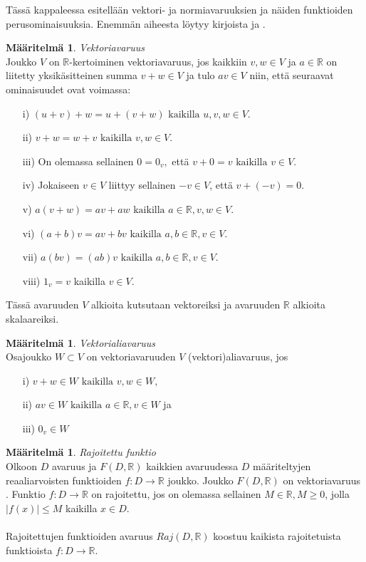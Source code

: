 \documentclass[12pt,a4paper,leqno]{report}
\newcommand{\R}{\mathbb{R}}
\newcommand{\N}{\mathbb{N}}
\theoremstyle{plain}
\theoremstyle{definition}
\newtheorem{maar}[equation]{Määritelmä}
\newtheorem{esim}[equation]{Esimerkki}
\theoremstyle{remark}
\begin{document}
Tässä kappaleessa esitellään vektori- ja normiavaruuksien ja näiden funktioiden perusominaisuuksia. Enemmän aiheesta löytyy kirjoista \cite{Topo1} ja \cite{Topo2}.
\begin{maar}
\emph{Vektoriavaruus}\\
Joukko $V$ on $\R$-kertoiminen vektoriavaruus, jos kaikkiin $v,w\in V$ ja $a\in \R$ on liitetty yksikäsitteinen summa $v+w\in V$ ja tulo $av\in V$ niin, että seuraavat ominaisuudet ovat voimassa:
\begin{itemize}
\item[i)\phantom{iiv}] $(u+v)+w=u+(v+w)\text{ kaikilla }u,v,w\in V.$
\item[ii)\phantom{iv}] $v+w=w+v\text{ kaikilla }v,w\in V.$
\item[iii)\phantom{v}] On olemassa sellainen $0=0_{v},$ että $v+0=v\text{ kaikilla }v\in V.$
\item[iv)\phantom{ii}] Jokaiseen $v\in V $ liittyy sellainen $-v\in V$, että $v+(-v)=0$.
\item[v)\phantom{iii}] $a(v+w)=av+aw\text{ kaikilla }a\in\R, v,w\in V.$
\item[vi)\phantom{ii}] $(a+b)v=av+bv\text{ kaikilla }a,b\in\R, v\in V.$
\item[vii)\phantom{i}] $a(bv)=(ab)v\text{ kaikilla }a,b\in\R, v\in V.$
\item[viii)] $1_{v}=v$ kaikilla $v\in V.$
\end{itemize}
Tässä avaruuden $V$ alkioita kutsutaan vektoreiksi ja avaruuden $\R$ alkioita skalaareiksi.

\end{maar}
\begin{maar}
\emph{Vektorialiavaruus}\\
Osajoukko $W\subset V$ on vektoriavaruuden $V$ (vektori)aliavaruus, jos
\begin{itemize}
\item[i)\phantom{iiv}] $v+w\in W\text{ kaikilla }v,w\in W,$
\item[ii)\phantom{iv}] $av\in W\text{ kaikilla }a\in\R, v\in W$ ja
\item[iii)\phantom{v}] $0_{v}\in W$
\end{itemize}

\end{maar}
\begin{maar}
\emph{Rajoitettu funktio}\\
Olkoon $D$ avaruus ja $F(D,\R)$ kaikkien avaruudessa $D$ määriteltyjen 
reaaliarvoisten funktioiden $f\colon D\rightarrow \R$ joukko. Joukko $F(D,\R)$ on vektoriavaruus \cite{Topo1}. %
Funktio $f\colon D\rightarrow \R$ on rajoitettu, 
jos on olemassa sellainen $M\in\R,M\geq 0$, 
jolla $|f(x)|\leq M$ kaikilla $x\in D$.\\\\
Rajoitettujen funktioiden avaruus $Raj(D,\R )$ koostuu kaikista rajoitetuista funktioista $f\colon D\rightarrow \R $.

\end{maar}
\end{document}
